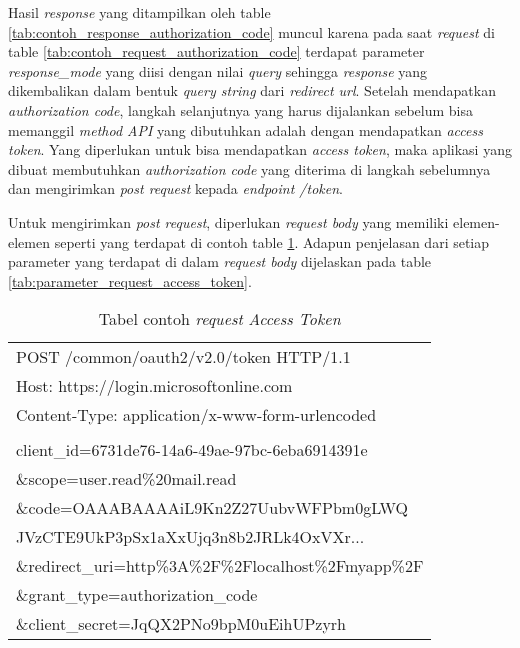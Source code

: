 \documentclass[a4paper,twoside]{article}
\begin{document}
\begin{enumerate}
Hasil \textit{response} yang ditampilkan oleh table \ref{tab:contoh_response_authorization_code} muncul karena pada saat \textit{request} di table \ref{tab:contoh_request_authorization_code} terdapat parameter \textit{response\_mode} yang diisi dengan nilai \textit{query} sehingga \textit{response} yang dikembalikan dalam bentuk \textit{query string} dari \textit{redirect url}. Setelah mendapatkan \textit{authorization code}, langkah selanjutnya yang harus dijalankan sebelum bisa memanggil \textit{method API} yang dibutuhkan adalah dengan mendapatkan \textit{access token}. Yang diperlukan untuk bisa mendapatkan \textit{access token}, maka aplikasi yang dibuat membutuhkan \textit{authorization code} yang diterima di langkah sebelumnya dan mengirimkan \textit{post request} kepada \textit{endpoint /token}. 

Untuk mengirimkan \textit{post request}, diperlukan \textit{request body} yang memiliki elemen-elemen seperti yang terdapat di contoh table \ref{tab:contoh_request_access_token}. Adapun penjelasan dari setiap parameter yang terdapat di dalam \textit{request body} dijelaskan pada table \ref{tab:parameter_request_access_token}. 

\begin{table}[H]
	\centering 
	\caption{Tabel contoh \textit{request} \textit{Access Token}}
	\label{tab:contoh_request_access_token}
	\begin{tabular}{|p{12cm}|}
	\hline
	POST /common/oauth2/v2.0/token HTTP/1.1\\
Host: https://login.microsoftonline.com\\
Content-Type: application/x-www-form-urlencoded\\
\\
client\_id=6731de76-14a6-49ae-97bc-6eba6914391e\\
\&scope=user.read\%20mail.read\\
\&code=OAAABAAAAiL9Kn2Z27UubvWFPbm0gLWQ\\
JVzCTE9UkP3pSx1aXxUjq3n8b2JRLk4OxVXr...\\
\&redirect\_uri=http\%3A\%2F\%2Flocalhost\%2Fmyapp\%2F\\
\&grant\_type=authorization\_code\\
\&client\_secret=JqQX2PNo9bpM0uEihUPzyrh \\ 
	\hline
	\end{tabular}  
\end{table}


\end{enumerate}
\end{document}
